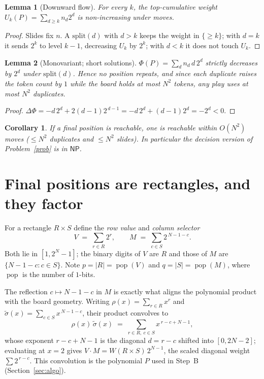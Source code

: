 \documentclass[11pt]{article}
\theoremstyle{definition}
\theoremstyle{plain}
\newtheorem{lemma}{Lemma}
\newtheorem{corollary}{Corollary}
\theoremstyle{remark}
\newcommand{\popc}{\operatorname{pop}}
\begin{document}
\begin{lemma}[Downward flow]\label{lem:U}
For every $k$, the top-cumulative weight $U_k(P)=\sum_{d\ge k}n_d 2^{d}$ is
non-increasing under moves.
\end{lemma}
\begin{proof}
Slides fix $n$.  A $\mathrm{split}(d)$ with $d>k$ keeps the weight in
$\{\ge k\}$; with $d=k$ it sends $2^{k}$ to level $k-1$, decreasing $U_k$ by
$2^{k}$; with $d<k$ it does not touch $U_k$.
\end{proof}

\begin{lemma}[Monovariant; short solutions]\label{lem:phi}
$\Phi(P)=\sum_d n_d\,d\,2^{d}$ strictly decreases by $2^{d}$ under
$\mathrm{split}(d)$.  Hence no position repeats, and since each duplicate raises
the token count by $1$ while the board holds at most $N^2$ tokens, any play uses
at most $N^2$ duplicates.
\end{lemma}
\begin{proof}
$\Delta\Phi=-d\,2^{d}+2(d-1)2^{\,d-1}=-d\,2^{d}+(d-1)2^{d}=-2^{d}<0$.
\end{proof}

\begin{corollary}\label{cor:np}
If a final position is reachable, one is reachable within $O(N^2)$ moves
($\le N^2$ duplicates and $\le N^2$ slides).  In particular the decision version
of Problem~\ref{prob} is in $\mathsf{NP}$.
\end{corollary}

\section{Final positions are rectangles, and they factor}\label{sec:fact}

For a rectangle $R\times S$ define the \emph{row value} and \emph{column
selector}
\[
V \;=\; \sum_{r\in R}2^{r}, \qquad M \;=\; \sum_{c\in S}2^{\,N-1-c}.
\]
Both lie in $[1,2^{N}-1]$; the binary digits of $V$ are $R$ and those of $M$ are
$\{N-1-c:c\in S\}$.  Note $p=|R|=\popc(V)$ and $q=|S|=\popc(M)$, where $\popc$ is
the number of $1$-bits.

The reflection $c\mapsto N-1-c$ in $M$ is exactly what aligns the polynomial product with the
board geometry. Writing $\rho(x)=\sum_{r\in R}x^{r}$ and
$\tilde\sigma(x)=\sum_{c\in S}x^{\,N-1-c}$, their product convolves to
\[
\rho(x)\,\tilde\sigma(x)\;=\;\sum_{r\in R,\ c\in S}x^{\,r-c+N-1},
\]
whose exponent $r-c+N-1$ is the diagonal $d=r-c$ shifted into $[0,2N-2]$; evaluating at $x=2$
gives $V\cdot M=W(R\times S)\,2^{N-1}$, the scaled diagonal weight $\sum 2^{\,r-c}$. This
convolution is the polynomial $P$ used in Step~B (Section~\ref{sec:algo}).
\end{document}
